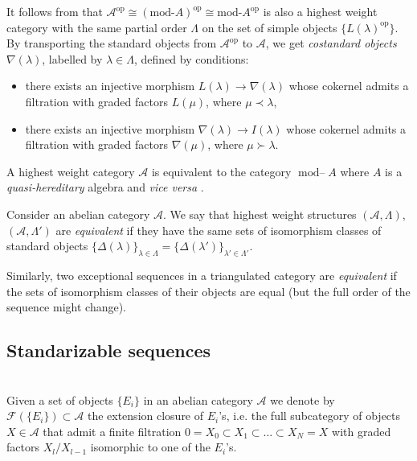 \documentclass[12pt,a4paper]{amsart}
\newcommand{\aA}{{\mathcal{A}}}
\newcommand{\fF}{{\mathcal{F}}}
\newcommand{\la}{\lambda}
\newcommand{\End}{\mathop{\textrm{End}}\nolimits}
\newcommand{\opp}{\mathop{\textrm{op}}\nolimits}
\newcommand{\modu}{\mathop{\textrm{mod--}}}
\theoremstyle{definition}
\begin{document}
It follows from 
\cite[Theorem 4.3]{ParSco} that $\aA^{\opp}\cong (\textrm{mod-}A)^{\opp} \cong \textrm{mod-}A^{\opp}$ is also a highest weight category with the same partial order $\Lambda$ on the set of simple objects $\{L(\la)^{\opp}\}$. By transporting the standard objects from $\aA^{\opp}$ to $\aA$, we get \emph{costandard objects} $\nabla(\la)$, labelled by $\la \in \Lambda$, defined by conditions: 
\begin{itemize}
	\item[(cost1)] there exists an injective morphism $L(\la) \to \nabla(\la)$ whose cokernel admits a filtration with graded factors $L(\mu)$, where $\mu \prec \la$,
	\item[(cost2)] 
	there exists an injective morphism $\nabla(\la) \to I(\la)$ whose cokernel admits a filtration with graded factors $\nabla(\mu)$, where  $\mu \succ\la$.
\end{itemize} 

A highest weight category $\aA$ is equivalent to the category $\modu A$ where $A$ is a \emph{quasi-hereditary} algebra and \textit{vice versa} \cite{CPS}.


Consider an abelian category $\aA$. We say that highest weight structures $(\aA, \Lambda)$, $(\aA, \Lambda')$ are \emph{equivalent} if they have the same sets of isomorphism classes of standard objects $\{\Delta(\la)\}_{\la \in \Lambda} = \{\Delta(\la')\}_{\la' \in \Lambda'}$. 

Similarly, two exceptional sequences in a triangulated category are \emph{equivalent} if the sets of isomorphism classes of their objects are equal (but the full order of the sequence might change).

\vspace{0.3cm}
\subsection{Standarizable sequences}~\\


Given a set of objects $\{E_i\}	$ in an abelian category $\aA$ we denote by $\fF(\{E_i\})\subset \aA$ the extension closure of $E_i$'s, i.e. the full subcategory of objects $X\in \aA$ that admit a finite filtration $0 =X_0 \subset X_1\subset \ldots \subset X_N = X$ with graded factors $X_l/X_{l-1}$ isomorphic to one of the $E_i$'s.
\end{document}
